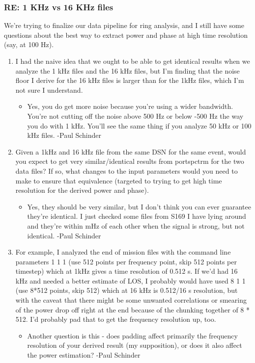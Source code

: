 \documentclass[crop=false,class=book]{standalone}
\begin{document}
        \subsubsection{\footnotesize RE: 1 KHz vs 16 KHz files}
        We're trying to finalize our data pipeline for ring analysis, and I still have some questions about the best way to extract power and phase at high time resolution (say, at 100 Hz). 
        \begin{enumerate}
            \item I had the naive idea that we ought to be able to get identical results when we analyze the 1 kHz files and the 16 kHz files, but I'm finding that the noise floor I derive for the 16 kHz files is larger than for the 1kHz files, which I'm not sure I understand. 
            \begin{itemize}
                \item Yes, you do get more noise because you’re using a wider bandwidth.  You’re not cutting off the noise above 500 Hz or below -500 Hz the way you do with 1 kHz.  You’ll see the same thing if you analyze 50 kHz or 100 kHz files. -Paul Schinder
            \end{itemize}
            \item Given a 1kHz and 16 kHz file from the same DSN for the same event, would you expect to get very similar/identical results from portspctrm for the two data files? If so, what changes to the input parameters would you need to make to ensure that equivalence (targeted to trying to get high time resolution for the derived power and phase).
            \begin{itemize}
                \item Yes, they should be very similar, but I don’t think you can ever guarantee they’re identical.  I just checked some files from S169 I have lying around and they’re within  mHz of each other when the signal is strong, but not identical. -Paul Schinder
            \end{itemize}
            \item For example, I analyzed the end of mission files with the command line parameters 1 1 1 (use 512 points per frequency point, skip 512 points per timestep) which at 1kHz gives a time resolution of 0.512 s.  If  we’d had 16 kHz and needed a better estimate of LOS, I probably would have used 8 1 1 (use 8*512 points, skip 512) which at 16 kHz is 0.512/16 s resolution, but with the caveat that there might be some unwanted correlations or smearing of the power drop off right at the end because of the chunking together of 8 * 512.  I’d probably pad that to get the frequency resolution up, too.
            \begin{itemize}
                \item Another question is this - does padding affect primarily the frequency resolution of your derived result (my supposition), or does it also affect the power estimation? -Paul Schinder
            \end{itemize}
        \end{enumerate}
\end{document}
